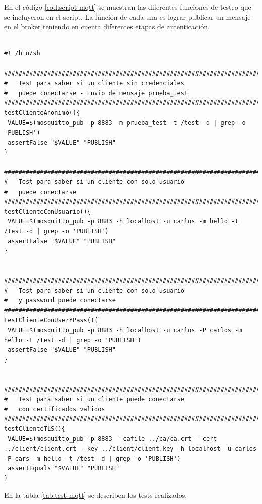 En el código \ref{cod:script-mqtt} se muestran las diferentes funciones de testeo que se incluyeron en el script. La función de cada una es lograr publicar un mensaje en el broker teniendo en cuenta diferentes etapas de autenticación. 

\begin{lstlisting}[label=cod:script-mqtt,caption=Script para testing de integridad y seguridad de broker MQTT.] 

#! /bin/sh

########################################################################
#	Test para saber si un cliente sin credenciales 
#	puede conectarse - Envio de mensaje prueba_test
########################################################################
testClienteAnonimo(){
 VALUE=$(mosquitto_pub -p 8883 -m prueba_test -t /test -d | grep -o 'PUBLISH') 	
 assertFalse "$VALUE" "PUBLISH"
}

########################################################################
#	Test para saber si un cliente con solo usuario 
#	puede conectarse
########################################################################
testClienteConUsuario(){
 VALUE=$(mosquitto_pub -p 8883 -h localhost -u carlos -m hello -t /test -d | grep -o 'PUBLISH') 
 assertFalse "$VALUE" "PUBLISH"
}


########################################################################
#	Test para saber si un cliente con solo usuario 
#	y password puede conectarse
########################################################################
testClienteConUserYPass(){
 VALUE=$(mosquitto_pub -p 8883 -h localhost -u carlos -P carlos -m hello -t /test -d | grep -o 'PUBLISH') 
 assertFalse "$VALUE" "PUBLISH"
}


########################################################################
#	Test para saber si un cliente puede conectarse
#	con certificados validos
########################################################################
testClienteTLS(){
 VALUE=$(mosquitto_pub -p 8883 --cafile ../ca/ca.crt --cert ../client/client.crt --key ../client/client.key -h localhost -u carlos -P cars -m hello -t /test -d | grep -o 'PUBLISH') 	
 assertEquals "$VALUE" "PUBLISH"
}

\end{lstlisting}

En la tabla \ref{tab:test-mqtt} se describen los tests realizados.

